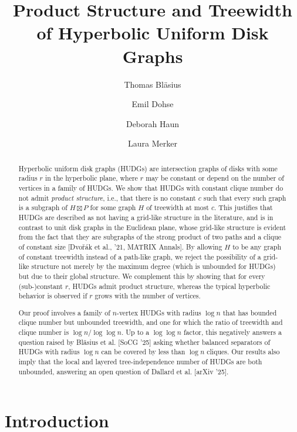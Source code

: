\documentclass[a4paper,english,cleveref,thm-restate]{lipics-v2021}
\title{Product Structure and Treewidth of Hyperbolic Uniform Disk Graphs}
\author{Thomas Bläsius}{Karlsruhe Institute of Technology, Germany}{thomas.blaesius@kit.edu}{https://orcid.org/0000-0003-2450-744X}{}
\author{Emil Dohse}{Karlsruhe Institute of Technology, Germany}{}{}{}
\author{Deborah Haun}{Karlsruhe Institute of Technology, Germany}{deborah.haun@student.kit.edu}{https://orcid.org/0009-0004-2365-0804}{}
\author{Laura Merker}{Karlsruhe Institute of Technology, Germany}{laura.merker2@kit.edu}{https://orcid.org/0000-0003-1961-4531}{}
\begin{document}
\maketitle

\begin{abstract}
    Hyperbolic uniform disk graphs (HUDGs) are intersection graphs of disks with some radius $r$ in the hyperbolic plane, where $r$ may be constant or depend on the number of vertices in a family of HUDGs.
    We show that HUDGs with constant clique number do not admit \emph{product structure}, i.e., that there is no constant $c$ such that every such graph is a subgraph of $H \boxtimes P$ for some graph $H$ of treewidth at most $c$.
    This justifies that HUDGs are described as not having a grid-like structure in the literature, and is in contrast to unit disk graphs in the Euclidean plane, whose grid-like structure is evident from the fact that they are subgraphs of the strong product of two paths and a clique of constant size [Dvořák et al., '21, MATRIX Annals].
    By allowing $H$ to be any graph of constant treewidth instead of a path-like graph, we reject the possibility of a grid-like structure not merely by the maximum degree (which is unbounded for HUDGs) but due to their global structure.
    We complement this by showing that for every (sub-)constant $r$, HUDGs admit product structure, whereas the typical hyperbolic behavior is observed if $r$ grows with the number of vertices. 
    
    Our proof involves a family of $n$-vertex HUDGs with radius $\log n$ that has bounded clique number but unbounded treewidth, and one for which the ratio of treewidth and clique number is $\log n / \log \log n$.
    Up to a $ \log \log n $ factor, this negatively answers a question raised by Bläsius et al. [SoCG '25] asking whether balanced separators of HUDGs with radius $\log n$ can be covered by less than $ \log n $ cliques.
    Our results also imply that the local and layered tree-independence number of HUDGs are both unbounded, answering an open question of Dallard et al. [arXiv '25].
\end{abstract}

\clearpage

\section{Introduction}
\label{sec:intro}
\end{document}
